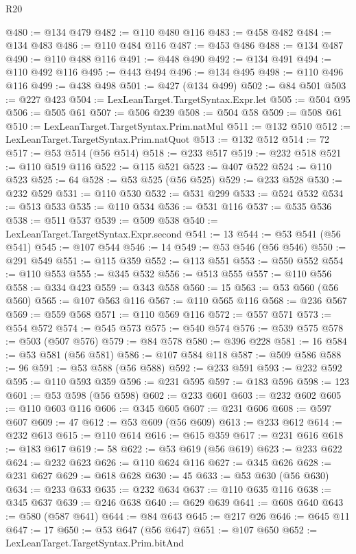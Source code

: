\begin{lexlean}{R20}
\begin{coremodule}
@480 := @134 @479
@482 := @110 @480 @116
@483 := @458 @482
@484 := @134 @483
@486 := @110 @484 @116
@487 := @453 @486
@488 := @134 @487
@490 := @110 @488 @116
@491 := @448 @490
@492 := @134 @491
@494 := @110 @492 @116
@495 := @443 @494
@496 := @134 @495
@498 := @110 @496 @116
@499 := @438 @498
@501 := @427 (@134 @499)
@502 := @84 @501
@503 := @227 @423
@504 := LexLeanTarget.TargetSyntax.Expr.let
@505 := @504 @95
@506 := @505 @61
@507 := @506 @239
@508 := @504 @58
@509 := @508 @61
@510 := LexLeanTarget.TargetSyntax.Prim.natMul
@511 := @132 @510
@512 := LexLeanTarget.TargetSyntax.Prim.natQuot
@513 := @132 @512
@514 := 72
@517 := @53 @514 (@56 @514)
@518 := @233 @517
@519 := @232 @518
@521 := @110 @519 @116
@522 := @115 @521
@523 := @407 @522
@524 := @110 @523
@525 := 64
@528 := @53 @525 (@56 @525)
@529 := @233 @528
@530 := @232 @529
@531 := @110 @530
@532 := @531 @299
@533 := @524 @532
@534 := @513 @533
@535 := @110 @534
@536 := @531 @116
@537 := @535 @536
@538 := @511 @537
@539 := @509 @538
@540 := LexLeanTarget.TargetSyntax.Expr.second
@541 := 13
@544 := @53 @541 (@56 @541)
@545 := @107 @544
@546 := 14
@549 := @53 @546 (@56 @546)
@550 := @291 @549
@551 := @115 @359
@552 := @113 @551
@553 := @550 @552
@554 := @110 @553
@555 := @345 @532
@556 := @513 @555
@557 := @110 @556
@558 := @334 @423
@559 := @343 @558
@560 := 15
@563 := @53 @560 (@56 @560)
@565 := @107 @563 @116
@567 := @110 @565 @116
@568 := @236 @567
@569 := @559 @568
@571 := @110 @569 @116
@572 := @557 @571
@573 := @554 @572
@574 := @545 @573
@575 := @540 @574
@576 := @539 @575
@578 := @503 (@507 @576)
@579 := @84 @578
@580 := @396 @228
@581 := 16
@584 := @53 @581 (@56 @581)
@586 := @107 @584 @118
@587 := @509 @586
@588 := 96
@591 := @53 @588 (@56 @588)
@592 := @233 @591
@593 := @232 @592
@595 := @110 @593 @359
@596 := @231 @595
@597 := @183 @596
@598 := 123
@601 := @53 @598 (@56 @598)
@602 := @233 @601
@603 := @232 @602
@605 := @110 @603 @116
@606 := @345 @605
@607 := @231 @606
@608 := @597 @607
@609 := 47
@612 := @53 @609 (@56 @609)
@613 := @233 @612
@614 := @232 @613
@615 := @110 @614
@616 := @615 @359
@617 := @231 @616
@618 := @183 @617
@619 := 58
@622 := @53 @619 (@56 @619)
@623 := @233 @622
@624 := @232 @623
@626 := @110 @624 @116
@627 := @345 @626
@628 := @231 @627
@629 := @618 @628
@630 := 45
@633 := @53 @630 (@56 @630)
@634 := @233 @633
@635 := @232 @634
@637 := @110 @635 @116
@638 := @345 @637
@639 := @246 @638
@640 := @629 @639
@641 := @608 @640
@643 := @580 (@587 @641)
@644 := @84 @643
@645 := @217 @26
@646 := @645 @11
@647 := 17
@650 := @53 @647 (@56 @647)
@651 := @107 @650
@652 := LexLeanTarget.TargetSyntax.Prim.bitAnd

\end{coremodule}
\end{lexlean}
